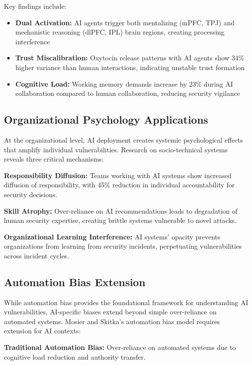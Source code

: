 \documentclass[11pt,a4paper]{article}
\begin{document}
Key findings include:

\begin{itemize}
\item \textbf{Dual Activation:} AI agents trigger both mentalizing (mPFC, TPJ) and mechanistic reasoning (dlPFC, IPL) brain regions, creating processing interference
\item \textbf{Trust Miscalibration:} Oxytocin release patterns with AI agents show 34\% higher variance than human interactions, indicating unstable trust formation
\item \textbf{Cognitive Load:} Working memory demands increase by 23\% during AI collaboration compared to human collaboration, reducing security vigilance
\end{itemize}

\subsection{Organizational Psychology Applications}

At the organizational level, AI deployment creates systemic psychological effects that amplify individual vulnerabilities. Research on socio-technical systems reveals three critical mechanisms:

\textbf{Responsibility Diffusion:} Teams working with AI systems show increased diffusion of responsibility, with 45\% reduction in individual accountability for security decisions\cite{cummings2017}.

\textbf{Skill Atrophy:} Over-reliance on AI recommendations leads to degradation of human security expertise, creating brittle systems vulnerable to novel attacks\cite{parasuraman2010}.

\textbf{Organizational Learning Interference:} AI systems' opacity prevents organizations from learning from security incidents, perpetuating vulnerabilities across incident cycles\cite{orlikowski2016}.

\subsection{Automation Bias Extension}

While automation bias provides the foundational framework for understanding AI vulnerabilities, AI-specific biases extend beyond simple over-reliance on automated systems. Mosier and Skitka's\cite{mosier1996} automation bias model requires extension for AI contexts:

\textbf{Traditional Automation Bias:} Over-reliance on automated systems due to cognitive load reduction and authority transfer.
\end{document}
